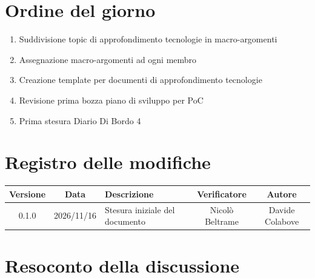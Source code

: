 \documentclass[a4paper, 11pt]{article}
\begin{document}
\section*{Ordine del giorno}
\begin{enumerate}
    \item Suddivisione topic di approfondimento tecnologie in macro-argomenti\vspace{-0.2cm}
    \item Assegnazione macro-argomenti ad ogni membro\vspace{-0.2cm}
    \item Creazione template per documenti di approfondimento tecnologie\vspace{-0.2cm}
    \item Revisione prima bozza piano di sviluppo per PoC\vspace{-0.2cm}
    \item Prima stesura Diario Di Bordo 4
\end{enumerate}
\vspace{-0.5cm}

\section*{Registro delle modifiche}
\begin{tabularx}{\textwidth}{|c|c|X|c|c|}
    \hline
    \textbf{Versione} & \textbf{Data} & \textbf{Descrizione} & \textbf{Verificatore} & \textbf{Autore} \\ \hline
    0.1.0 & 2026/11/16 & Stesura iniziale del documento & Nicolò Beltrame & Davide Colabove \\ \hline
\end{tabularx}

\newpage
\tableofcontents
\newpage


\section{Resoconto della discussione}
\end{document}
